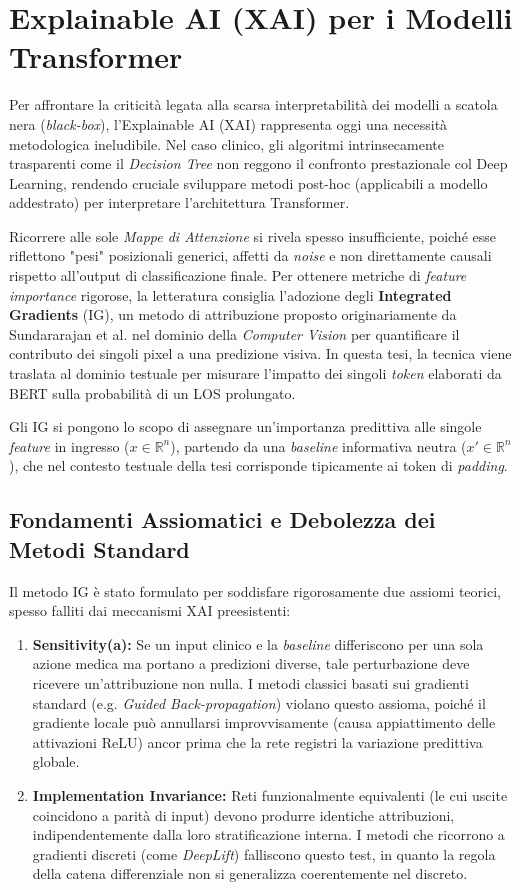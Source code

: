 \section{Explainable AI (XAI) per i Modelli Transformer}
Per affrontare la criticità legata alla scarsa interpretabilità dei modelli a scatola nera (\textit{black-box}), l'Explainable AI (XAI) rappresenta oggi una necessità metodologica ineludibile. Nel caso clinico, gli algoritmi intrinsecamente trasparenti come il \textit{Decision Tree} non reggono il confronto prestazionale col Deep Learning, rendendo cruciale sviluppare metodi post-hoc (applicabili a modello addestrato) per interpretare l'architettura Transformer.

Ricorrere alle sole \textit{Mappe di Attenzione} si rivela spesso insufficiente, poiché esse riflettono "pesi" posizionali generici, affetti da \textit{noise} e non direttamente causali rispetto all'output di classificazione finale.
Per ottenere metriche di \textit{feature importance} rigorose, la letteratura consiglia l'adozione degli \textbf{Integrated Gradients} (IG), un metodo di attribuzione proposto originariamente da Sundararajan et al. \cite{sundararajan2017axiomatic} nel dominio della \textit{Computer Vision} per quantificare il contributo dei singoli pixel a una predizione visiva. In questa tesi, la tecnica viene traslata al dominio testuale per misurare l'impatto dei singoli \textit{token} elaborati da BERT sulla probabilità di un LOS prolungato.

Gli IG si pongono lo scopo di assegnare un'importanza predittiva alle singole \textit{feature} in ingresso ($x \in \mathbb{R}^n$), partendo da una \textit{baseline} informativa neutra ($x' \in \mathbb{R}^n$), che nel contesto testuale della tesi corrisponde tipicamente ai token di \textit{padding}.

\subsection{Fondamenti Assiomatici e Debolezza dei Metodi Standard}
Il metodo IG è stato formulato per soddisfare rigorosamente due assiomi teorici, spesso falliti dai meccanismi XAI preesistenti:
\begin{enumerate}
    \item \textbf{Sensitivity(a):} Se un input clinico e la \textit{baseline} differiscono per una sola azione medica ma portano a predizioni diverse, tale perturbazione deve ricevere un'attribuzione non nulla. I metodi classici basati sui gradienti standard (e.g. \textit{Guided Back-propagation}) violano questo assioma, poiché il gradiente locale può annullarsi improvvisamente (causa appiattimento delle attivazioni ReLU) ancor prima che la rete registri la variazione predittiva globale.
    \item \textbf{Implementation Invariance:} Reti funzionalmente equivalenti (le cui uscite coincidono a parità di input) devono produrre identiche attribuzioni, indipendentemente dalla loro stratificazione interna. I metodi che ricorrono a gradienti discreti (come \textit{DeepLift}) falliscono questo test, in quanto la regola della catena differenziale non si generalizza coerentemente nel discreto.
\end{enumerate}

